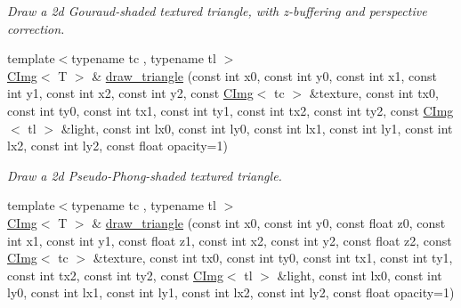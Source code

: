 \begin{DoxyCompactItemize}
\begin{DoxyCompactList}\small\item\em Draw a 2d Gouraud-\/shaded textured triangle, with z-\/buffering and perspective correction. \item\end{DoxyCompactList}\item 
{\footnotesize template$<$typename tc , typename tl $>$ }\\\hyperlink{structcimg__library_1_1CImg}{CImg}$<$ T $>$ \& \hyperlink{structcimg__library_1_1CImg_a261696a882cafea6ec41e43f90ad7d26}{draw\_\-triangle} (const int x0, const int y0, const int x1, const int y1, const int x2, const int y2, const \hyperlink{structcimg__library_1_1CImg}{CImg}$<$ tc $>$ \&texture, const int tx0, const int ty0, const int tx1, const int ty1, const int tx2, const int ty2, const \hyperlink{structcimg__library_1_1CImg}{CImg}$<$ tl $>$ \&light, const int lx0, const int ly0, const int lx1, const int ly1, const int lx2, const int ly2, const float opacity=1)
\begin{DoxyCompactList}\small\item\em Draw a 2d Pseudo-\/Phong-\/shaded textured triangle. \item\end{DoxyCompactList}\item 
\hypertarget{structcimg__library_1_1CImg_afeb86cbec72b30c58246379a6a94c295}{
{\footnotesize template$<$typename tc , typename tl $>$ }\\\hyperlink{structcimg__library_1_1CImg}{CImg}$<$ T $>$ \& \hyperlink{structcimg__library_1_1CImg_afeb86cbec72b30c58246379a6a94c295}{draw\_\-triangle} (const int x0, const int y0, const float z0, const int x1, const int y1, const float z1, const int x2, const int y2, const float z2, const \hyperlink{structcimg__library_1_1CImg}{CImg}$<$ tc $>$ \&texture, const int tx0, const int ty0, const int tx1, const int ty1, const int tx2, const int ty2, const \hyperlink{structcimg__library_1_1CImg}{CImg}$<$ tl $>$ \&light, const int lx0, const int ly0, const int lx1, const int ly1, const int lx2, const int ly2, const float opacity=1)}
\label{structcimg__library_1_1CImg_afeb86cbec72b30c58246379a6a94c295}


\end{DoxyCompactItemize}
